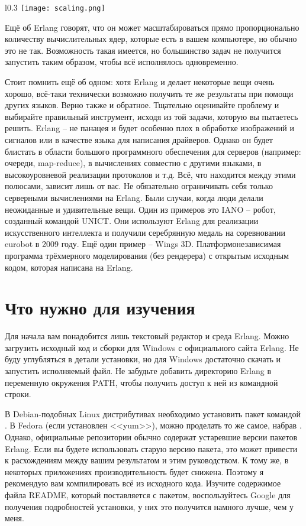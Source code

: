\begin{wrapfigure}{l}{0.3\linewidth}
    \texttt{[image: scaling.png]}
\end{wrapfigure}
Ещё об Erlang говорят, что он может масштабироваться прямо пропорционально количеству вычислительных ядер, которые есть в вашем компьютере, но обычно это не так.
Возможность такая имеется, но большинство задач не получится запустить таким образом, чтобы всё исполнялось одновременно.

Стоит помнить ещё об одном: хотя Erlang и делает некоторые вещи очень хорошо, всё\--таки технически возможно получить те же результаты при помощи других языков.
Верно также и обратное.
Тщательно оценивайте проблему и выбирайте правильный инструмент, исходя из той задачи, которую вы пытаетесь решить.
Erlang \--- не панацея и будет особенно плох в обработке изображений и сигналов или в качестве языка для написания драйверов.
Однако он будет блистать в области большого программного обеспечения для серверов (например: очереди, map\--reduce), в вычислениях совместно с другими языками, в высокоуровневой реализации протоколов и т.д.
Всё, что находится между этими полюсами, зависит лишь от вас.
Не обязательно ограничивать себя только серверными вычислениями на Erlang.
Были случаи, когда люди делали неожиданные и удивительные вещи.
Один из примеров это IANO \--- робот, созданный командой UNICT.
Они используют Erlang для реализации искусственного интеллекта и получили серебрянную медаль на соревновании eurobot в 2009 году.
Ещё один пример \--- Wings 3D.
Платформонезависимая программа трёхмерного моделирования (без рендерера) с открытым исходным кодом, которая написана на Erlang.

\section{Что нужно для изучения}
Для начала вам понадобится лишь текстовый редактор и среда Erlang.
Можно загрузить исходный код и сборки для Windows с официального сайта Erlang.
Не буду углубляться в детали установки, но для Windows достаточно скачать и запустить исполняемый файл.
Не забудьте добавить директорию Erlang в переменную окружения PATH, чтобы получить доступ к ней из командной строки.

В Debian\--подобных Linux дистрибутивах необходимо установить пакет командой .
В Fedora (если установлен <<yum>>), можно проделать то же самое, набрав .
Однако, официальные репозитории обычно содержат устаревшие версии пакетов Erlang.
Если вы будете использовать старую версию пакета, это может привести к расхождениям между вашим результатом и этим руководством.
К тому же, в некоторых приложениях производительность будет снижена.
Поэтому я рекомендую вам компилировать всё из исходного кода.
Изучите содержимое файла README, который поставляется с пакетом, воспользуйтесь Google для получения подробностей установки, у них это получится намного лучше, чем у меня.

